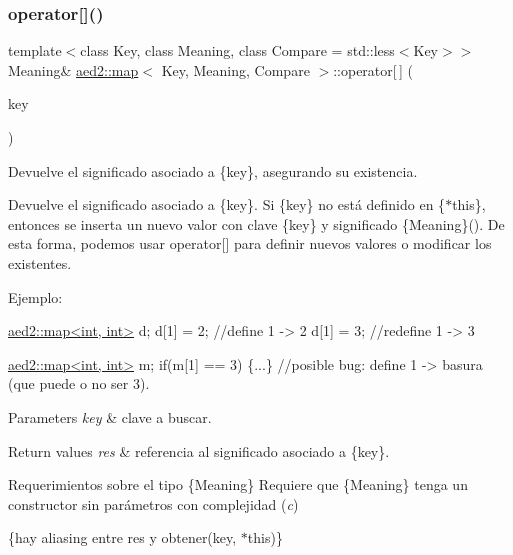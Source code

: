 \subsubsection{\texorpdfstring{operator[]()}{operator[]()}\hspace{0.1cm}{\footnotesize\ttfamily [1/2]}}
{\footnotesize\ttfamily template$<$class Key, class Meaning, class Compare = std\+::less$<$\+Key$>$$>$ \\
Meaning\& \hyperlink{classaed2_1_1map}{aed2\+::map}$<$ Key, Meaning, Compare $>$\+::operator\mbox{[}$\,$\mbox{]} (\begin{DoxyParamCaption}\item[{const Key \&}]{key }\end{DoxyParamCaption})\hspace{0.3cm}{\ttfamily [inline]}}



Devuelve el significado asociado a \{key\}, asegurando su existencia. 

Devuelve el significado asociado a \{key\}. Si \{key\} no está definido en \{$\ast$this\}, entonces se inserta un nuevo valor con clave \{key\} y significado \{Meaning\}(). De esta forma, podemos usar {\ttfamily operator\mbox{[}\mbox{]}} para definir nuevos valores o modificar los existentes.

Ejemplo\+: 
\begin{DoxyCode}
\hyperlink{classaed2_1_1map}{aed2::map<int, int>} d;
d[1] = 2;      \textcolor{comment}{//define 1 -> 2}
d[1] = 3;      \textcolor{comment}{//redefine 1 -> 3}

\hyperlink{classaed2_1_1map}{aed2::map<int, int>} m;
\textcolor{keywordflow}{if}(m[1] == 3) \{...\} \textcolor{comment}{//posible bug: define 1 -> basura (que puede o no ser 3).}
\end{DoxyCode}



\begin{DoxyParams}{Parameters}
{\em key} & clave a buscar. \\
\hline
\end{DoxyParams}

\begin{DoxyRetVals}{Return values}
{\em res} & referencia al significado asociado a \{key\}.\\
\hline
\end{DoxyRetVals}
\begin{DoxyParagraph}{Requerimientos sobre el tipo \{Meaning\}}
Requiere que \{Meaning\} tenga un constructor sin parámetros con complejidad ({\itshape c})
\end{DoxyParagraph}
\{hay aliasing entre res y obtener(key, $\ast$this)\}

